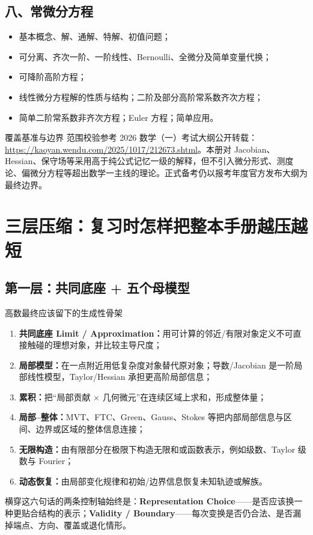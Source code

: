\documentclass[11pt,a4paper,openany]{ctexbook}
\newcommand{\key}[1]{\textbf{\color{deep}#1}}
\begin{document}
\section*{八、常微分方程}
\begin{itemize}
  \item 基本概念、解、通解、特解、初值问题；
  \item 可分离、齐次一阶、一阶线性、Bernoulli、全微分及简单变量代换；
  \item 可降阶高阶方程；
  \item 线性微分方程解的性质与结构；二阶及部分高阶常系数齐次方程；
  \item 简单二阶常系数非齐次方程；Euler 方程；简单应用。
\end{itemize}

\begin{methodbox}{覆盖基准与边界}
范围校验参考 2026 数学（一）考试大纲公开转载：\url{https://kaoyan.wendu.com/2025/1017/212673.shtml}。本册对 Jacobian、Hessian、保守场等采用高于纯公式记忆一级的解释，但不引入微分形式、测度论、偏微分方程等超出数学一主线的理论。正式备考仍以报考年度官方发布大纲为最终边界。
\end{methodbox}

\chapter{三层压缩：复习时怎样把整本手册越压越短}

\section{第一层：共同底座 + 五个母模型}
\begin{corebox}{高数最终应该留下的生成性骨架}
\begin{enumerate}
  \item \key{共同底座 Limit / Approximation：}用可计算的邻近/有限对象定义不可直接触碰的理想对象，并比较主导尺度；
  \item \key{局部模型：}在一点附近用低复杂度对象替代原对象；导数/Jacobian 是一阶局部线性模型，Taylor/Hessian 承担更高阶局部信息；
  \item \key{累积：}把“局部贡献 $\times$ 几何微元”在连续区域上求和，形成整体量；
  \item \key{局部--整体：}MVT、FTC、Green、Gauss、Stokes 等把内部局部信息与区间、边界或区域的整体信息连接；
  \item \key{无限构造：}由有限部分在极限下构造无限和或函数表示，例如级数、Taylor 级数与 Fourier；
  \item \key{动态恢复：}由局部变化规律和初始/边界信息恢复未知轨迹或解族。
\end{enumerate}
\medskip
横穿这六句话的两条控制轴始终是：\key{Representation Choice}——是否应该换一种更贴合结构的表示；\key{Validity / Boundary}——每次变换是否仍合法、是否漏掉端点、方向、覆盖或退化情形。
\end{corebox}
\end{document}
